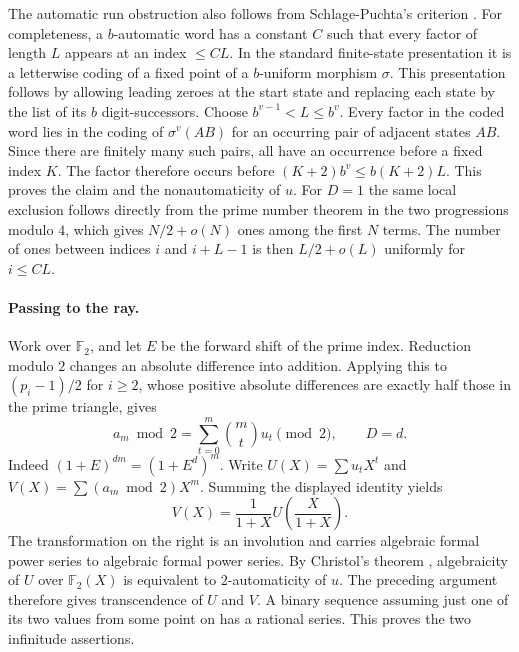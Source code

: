 \documentclass[11pt,a4paper]{article}
\begin{document}
The automatic run obstruction also follows from Schlage-Puchta's criterion \cite[Theorem~3]{puchta}. For completeness, a $b$-automatic word has a constant $C$ such that every factor of length $L$ appears at an index $\le CL$. In the standard finite-state presentation it is a letterwise coding of a fixed point of a $b$-uniform morphism $\sigma$. This presentation follows by allowing leading zeroes at the start state and replacing each state by the list of its $b$ digit-successors. Choose $b^{v-1}<L\le b^v$. Every factor in the coded word lies in the coding of $\sigma^v(AB)$ for an occurring pair of adjacent states $AB$. Since there are finitely many such pairs, all have an occurrence before a fixed index $K$. The factor therefore occurs before $(K+2)b^v\le b(K+2)L$. This proves the claim and the nonautomaticity of $u$. For $D=1$ the same local exclusion follows directly from the prime number theorem in the two progressions modulo $4$, which gives $N/2+o(N)$ ones among the first $N$ terms. The number of ones between indices $i$ and $i+L-1$ is then $L/2+o(L)$ uniformly for $i\le CL$.

\paragraph{Passing to the ray.}
Work over $\mathbb F_2$, and let $E$ be the forward shift of the prime index. Reduction modulo $2$ changes an absolute difference into addition. Applying this to $(p_i-1)/2$ for $i\ge2$, whose positive absolute differences are exactly half those in the prime triangle, gives
\[
 a_m\bmod2=\sum_{t=0}^m\binom mt u_t\pmod2,\qquad D=d.
\]
Indeed $(1+E)^{dm}=(1+E^d)^m$. Write $U(X)=\sum u_t X^t$ and $V(X)=\sum (a_m\bmod2)X^m$. Summing the displayed identity yields
\[
 V(X)=\frac{1}{1+X}U\!\left(\frac{X}{1+X}\right).
\]
The transformation on the right is an involution and carries algebraic formal power series to algebraic formal power series. By Christol's theorem \cite{christol}, algebraicity of $U$ over $\mathbb F_2(X)$ is equivalent to $2$-automaticity of $u$. The preceding argument therefore gives transcendence of $U$ and $V$. A binary sequence assuming just one of its two values from some point on has a rational series. This proves the two infinitude assertions.
\end{document}

